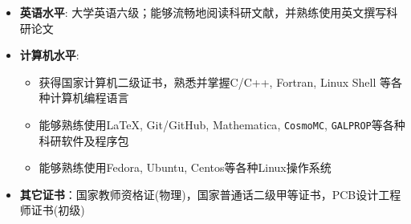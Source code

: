   \begin{itemize}[leftmargin=*]
    \item \textbf{英语水平}: 大学英语六级；能够流畅地阅读科研文献，并熟练使用英文撰写科研论文
    \item \textbf{计算机水平}: 
\begin{itemize}
\item 获得国家计算机二级证书，熟悉并掌握C/C++, Fortran, Linux Shell 等各种计算机编程语言
\item 能够熟练使用{\LaTeX}, {Git/GitHub}, {Mathematica}, {\tt CosmoMC}, {\tt GALPROP}等各种科研软件及程序包
\item 能够熟练使用Fedora, Ubuntu, Centos等各种Linux操作系统
\end{itemize}

    \item \textbf{其它证书}：国家教师资格证(物理)，国家普通话二级甲等证书，PCB设计工程师证书(初级)

  \end{itemize}
  
